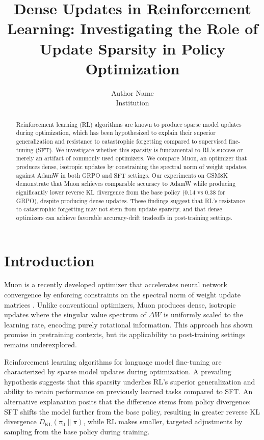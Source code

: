 \documentclass[11pt]{article}
\title{Dense Updates in Reinforcement Learning: Investigating the Role of Update Sparsity in Policy Optimization}
\author{Author Name\\Institution}
\date{}
\begin{document}
\maketitle

\begin{abstract}
Reinforcement learning (RL) algorithms are known to produce sparse model updates during optimization, which has been hypothesized to explain their superior generalization and resistance to catastrophic forgetting compared to supervised fine-tuning (SFT). We investigate whether this sparsity is fundamental to RL's success or merely an artifact of commonly used optimizers. We compare Muon, an optimizer that produces dense, isotropic updates by constraining the spectral norm of weight updates, against AdamW in both GRPO and SFT settings. Our experiments on GSM8K demonstrate that Muon achieves comparable accuracy to AdamW while producing significantly lower reverse KL divergence from the base policy (0.14 vs 0.38 for GRPO), despite producing dense updates. These findings suggest that RL's resistance to catastrophic forgetting may not stem from update sparsity, and that dense optimizers can achieve favorable accuracy-drift tradeoffs in post-training settings.
\end{abstract}

\section{Introduction}

Muon is a recently developed optimizer that accelerates neural network convergence by enforcing constraints on the spectral norm of weight update matrices \citep{jordan2024muon}. Unlike conventional optimizers, Muon produces dense, isotropic updates where the singular value spectrum of $\Delta W$ is uniformly scaled to the learning rate, encoding purely rotational information. This approach has shown promise in pretraining contexts, but its applicability to post-training settings remains underexplored.

Reinforcement learning algorithms for language model fine-tuning are characterized by sparse model updates during optimization. A prevailing hypothesis suggests that this sparsity underlies RL's superior generalization and ability to retain performance on previously learned tasks compared to SFT. An alternative explanation posits that the difference stems from policy divergence: SFT shifts the model further from the base policy, resulting in greater reverse KL divergence $D_{\text{KL}}(\pi_0 \| \pi)$, while RL makes smaller, targeted adjustments by sampling from the base policy during training.
\end{document}
